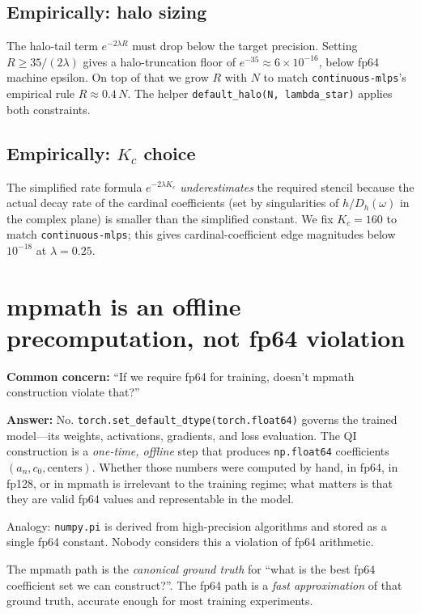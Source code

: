 \documentclass[11pt]{article}
\begin{document}
\subsection{Empirically: halo sizing}

The halo-tail term $e^{-2\lambda R}$ must drop below the target precision. Setting
$R \geq 35/(2\lambda)$ gives a halo-truncation floor of $e^{-35} \approx 6\times 10^{-16}$,
below fp64 machine epsilon. On top of that we grow $R$ with $N$ to match
\texttt{continuous-mlps}'s empirical rule $R \approx 0.4\,N$. The helper
\texttt{default\_halo(N, lambda\_star)} applies both constraints.

\subsection{Empirically: $K_c$ choice}

The simplified rate formula $e^{-2\lambda K_c}$ \emph{underestimates} the required stencil
because the actual decay rate of the cardinal coefficients (set by singularities of
$h/D_h(\omega)$ in the complex plane) is smaller than the simplified constant. We fix
$K_c = 160$ to match \texttt{continuous-mlps}; this gives cardinal-coefficient edge
magnitudes below $10^{-18}$ at $\lambda=0.25$.

\section{mpmath is an offline precomputation, not fp64 violation}

\textbf{Common concern:} ``If we require fp64 for training, doesn't mpmath construction violate that?''

\textbf{Answer:} No. \texttt{torch.set\_default\_dtype(torch.float64)} governs the trained
model---its weights, activations, gradients, and loss evaluation. The QI construction is a
\emph{one-time, offline} step that produces \texttt{np.float64} coefficients
$(a_n, c_0, \text{centers})$. Whether those numbers were computed by hand, in fp64, in fp128,
or in mpmath is irrelevant to the training regime; what matters is that they are valid fp64
values and representable in the model.

Analogy: \texttt{numpy.pi} is derived from high-precision algorithms and stored as a single
fp64 constant. Nobody considers this a violation of fp64 arithmetic.

The mpmath path is the \emph{canonical ground truth} for ``what is the best fp64 coefficient
set we can construct?''. The fp64 path is a \emph{fast approximation} of that ground truth,
accurate enough for most training experiments.
\end{document}
